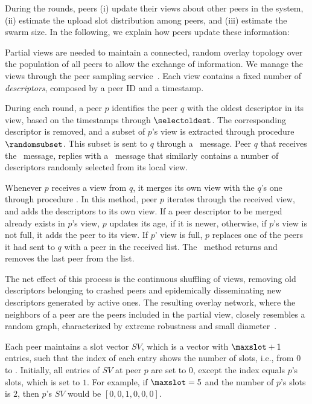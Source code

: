 During the rounds, peers (i) update their views about other peers in the system, (ii) estimate the upload slot distribution among peers, and (iii) estimate the swarm size. In the following, we explain how peers update these information:

 Partial views are needed to maintain a connected, random overlay topology over
the population of all peers to allow the exchange of information. We manage
the views through the \cyclon peer sampling service~\cite{cyclon}. Each view
contains a fixed number of {\em descriptors}, composed by a peer ID and a
timestamp.

During each round, a peer $p$ identifies the peer $q$ with the
oldest descriptor in its view, based on the timestamps through
$\selectoldest$. The corresponding
descriptor is removed, and a subset of $p$'s view is extracted through
procedure $\randomsubset$. This subset is sent to $q$ through a \request\ message. 
Peer $q$ that receives the \request\ message, replies with a \reply\ message
that similarly contains a number of descriptors randomly selected from its
local view.

Whenever $p$ receives a view from $q$, it merges its own view with the
$q$'s one through procedure \MergeView. In this method, peer $p$ iterates through the received
view, and adds the descriptors to its own view. If a peer descriptor to be merged already
exists in $p$'s view, $p$ updates its age, if it is newer, otherwise, if $p$'s view is not full, it
adds the peer to its view. If $p$' view is
full, $p$ replaces one of the peers it had sent to $q$ with a peer in the
received list. The \poll\ method returns and removes the last peer from the
list.

The net effect of this process is the continuous shuffling of views,
removing old descriptors belonging to crashed peers and epidemically
disseminating new descriptors generated by active ones. The resulting overlay
network, where the neighbors of a peer are the peers included in the partial
view, closely resembles a random graph, characterized by extreme robustness
and small diameter~\cite{cyclon}.

Each peer maintains a slot vector $SV$, which is a vector with $\maxslot+1$ entries, such that the index of each entry
shows the number of slots, i.e., from $0$ to \maxslot. Initially, all entries
of $SV$ at peer $p$ are set to $0$, except the index equals $p$'s slots, which is set to $1$. For example, if $\maxslot=5$ and the number of $p$'s slots is $2$, then $p$'s $SV$ would be $[0, 0, 1, 0, 0, 0]$.

